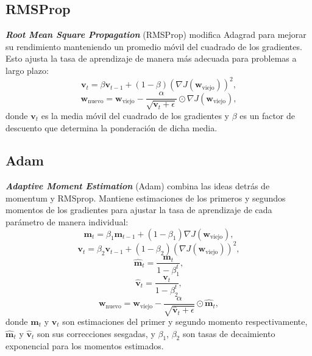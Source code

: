 \subsection{RMSProp}

\textbf{\textit{Root Mean Square Propagation}} (RMSProp) \cite{hinton2012lecture} modifica Adagrad para mejorar su rendimiento manteniendo un promedio móvil del cuadrado de los gradientes. Esto ajusta la tasa de aprendizaje de manera más adecuada para problemas a largo plazo:
\begin{equation}
	\mathbf{v}_{t} = \beta \mathbf{v}_{t-1} + (1 - \beta) (\nabla J(\mathbf{w}_{\text{viejo}}))^2,
\end{equation}
\begin{equation}
	\mathbf{w}_{\text{nuevo}} = \mathbf{w}_{\text{viejo}} - \frac{\alpha}{\sqrt{\mathbf{v}_{t} + \epsilon}} \odot \nabla J(\mathbf{w}_{\text{viejo}}),
\end{equation}
donde \(\mathbf{v}_{t}\) es la media móvil del cuadrado de los gradientes y \(\beta\) es un factor de descuento que determina la ponderación de dicha media.

\subsection{Adam}

\textbf{\textit{Adaptive Moment Estimation}} (Adam) \cite{kingma2014adam} combina las ideas detrás de momentum y RMSprop. Mantiene estimaciones de los primeros y segundos momentos de los gradientes para ajustar la tasa de aprendizaje de cada parámetro de manera individual:
\begin{equation}
	\mathbf{m}_{t} = \beta_1 \mathbf{m}_{t-1} + (1 - \beta_1)\nabla J(\mathbf{w}_{\text{viejo}}),
\end{equation}
\begin{equation}
	\mathbf{v}_{t} = \beta_2 \mathbf{v}_{t-1} + (1 - \beta_2)(\nabla J(\mathbf{w}_{\text{viejo}}))^2,
\end{equation}
\begin{equation}
	\hat{\mathbf{m}}_{t} = \frac{\mathbf{m}_{t}}{1 - \beta_1^t},
\end{equation}
\begin{equation}
	\hat{\mathbf{v}}_{t} = \frac{\mathbf{v}_{t}}{1 - \beta_2^t},
\end{equation}
\begin{equation}
	\mathbf{w}_{\text{nuevo}} = \mathbf{w}_{\text{viejo}} - \frac{\alpha}{\sqrt{\hat{\mathbf{v}}_{t} + \epsilon}} \odot \hat{\mathbf{m}}_{t},
\end{equation}
donde \(\mathbf{m}_{t}\) y \(\mathbf{v}_{t}\) son estimaciones del primer y segundo momento respectivamente, \(\hat{\mathbf{m}}_{t}\) y \(\hat{\mathbf{v}}_{t}\) son sus correcciones sesgadas, y \(\beta_1\), \(\beta_2\) son tasas de decaimiento exponencial para los momentos estimados.

